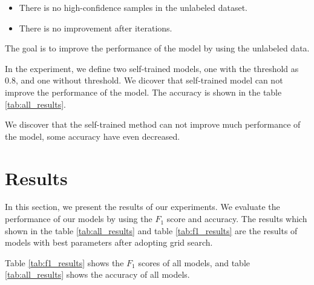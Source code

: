 \documentclass[11pt]{article}
\begin{document}
\begin{itemize}
    \item There is no high-confidence samples in the unlabeled dataset.
    \item There is no improvement after iterations. 
\end{itemize}

The goal is to improve the performance of the model by using the unlabeled data.

In the experiment, we define two self-trained models, one with the threshold as 0.8, and one without threshold.
We dicover that self-trained model can not improve the performance of the model.
The accuracy is shown in the table \ref{tab:all_results}.

We discover that the self-trained method can not improve much performance of the model, 
some accuracy have even decreased.


\section{Results}

In this section, we present the results of our experiments.
We evaluate the performance of our models by using the $F_1$ score and accuracy.
The results which shown in the table \ref{tab:all_results} and table \ref{tab:f1_results} are the results of models with best parameters after adopting grid search.

Table \ref{tab:f1_results} shows the $F_1$ scores of all models,
and table \ref{tab:all_results} shows the accuracy of all models.
\end{document}
